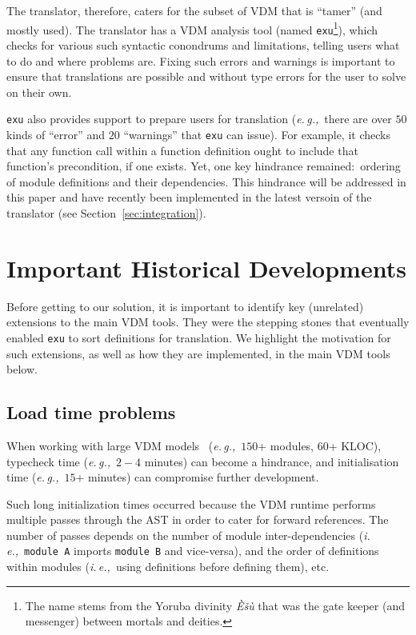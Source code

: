 \documentclass[runningheads,a4paper]{llncs}
\newcommand{\eg}{{\em e.\,g.,\/}}
\newcommand{\ie}{{\em i.\,e.,\/}}
\begin{document}
The translator, therefore, caters for the subset of VDM that is ``tamer'' (and mostly used). The translator has a VDM analysis tool (named \texttt{exu}\footnote{The name stems from the Yoruba divinity \textit{\`{E}\v{s}\`{u}} that was the gate keeper (and messenger) between mortals and deities.}), which checks for various such syntactic conondrums and limitations, telling users what to do and where problems are. Fixing such errors and warnings is important to ensure that translations are possible and without type errors for the user to solve on their own.  

\texttt{exu} also provides support to prepare users for translation (\eg~there are over \(50\) kinds of ``error'' and \(20\) ``warnings'' that \texttt{exu} can issue). For example, it checks that any function call within a function definition ought to include that function's precondition, if one exists. Yet, one key hindrance remained:~ordering of module definitions and their dependencies. This hindrance will be addressed in this paper and have recently been implemented in the latest versoin of the translator (see Section~\ref{sec:integration}). 


\section{Important Historical Developments}\label{sec:history}

Before getting to our solution, it is important to identify key (unrelated) extensions to the main VDM tools. They were the stepping stones that eventually enabled \texttt{exu} to sort definitions for translation. We highlight the motivation for such extensions, as well as how they are implemented, in the main VDM tools below.

\subsection{Load time problems}

When working with large VDM models~\cite{emv2} (\eg~\(150\)+ modules, \(60\)+ KLOC), typecheck time (\eg~\(2-4\) minutes) can become a hindrance, and initialisation time (\eg~\(15\)+ minutes) can compromise further development. 

Such long initialization times occurred because the VDM runtime performs multiple passes through the AST in order to cater for forward references. The number of passes depends on the number of module inter-dependencies (\ie~\texttt{module A} imports \texttt{module B} and vice-versa), and the order of definitions within modules (\ie~using definitions before defining them), etc. 
\end{document}
